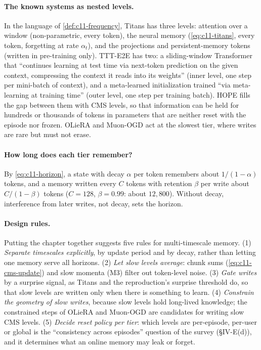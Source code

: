 \paragraph{The known systems as nested levels.} In the language of \cref{def:c11-frequency}, Titans
has three levels: attention over a window (non-parametric, every token), the neural memory
(\cref{eq:c11-titans}, every token, forgetting at rate $\alpha_t$), and the projections and
persistent-memory tokens (written in pre-training only). TTT-E2E \citep{tandon2025ttte2e} has two:
a sliding-window Transformer that ``continues learning at test time via next-token prediction on
the given context, compressing the context it reads into its weights'' (inner level, one step per
mini-batch of context), and a meta-learned initialization trained ``via meta-learning at training
time'' (outer level, one step per training batch). HOPE fills the gap between them with CMS levels,
so that information can be held for hundreds or thousands of tokens in parameters that are
neither reset with the episode nor frozen. OLieRA and Muon-OGD act at the slowest tier, where
writes are rare but must not erase.

\paragraph{How long does each tier remember?} By \cref{eq:c11-horizon}, a state with decay $\alpha$
per token remembers about $1/(1-\alpha)$ tokens, and a memory written every $C$ tokens with
retention $\beta$ per write about $C/(1-\beta)$ tokens ($C = 128$, $\beta = 0.99$: about $12{,}800$).
Without decay, interference from later writes, not decay, sets the horizon.

\paragraph{Design rules.} Putting the chapter together suggests five rules for multi-timescale
memory. (1) \emph{Separate timescales explicitly}, by update period and by decay, rather than
letting one memory serve all horizons. (2) \emph{Let slow levels average}: chunk sums
(\cref{eq:c11-cms-update}) and slow momenta (M3) filter out token-level noise. (3) \emph{Gate writes}
by a surprise signal, as Titans and the reproduction's surprise threshold do, so that slow levels
are written only when there is something to learn. (4) \emph{Constrain the geometry of slow
writes}, because slow levels hold long-lived knowledge; the constrained steps of OLieRA and
Muon-OGD are candidates for writing slow CMS levels. (5) \emph{Decide reset policy per tier}: which
levels are per-episode, per-user or global is the ``consistency across episodes'' question of
the survey (\S IV-E(d)), and it determines what an online memory may leak or forget.

